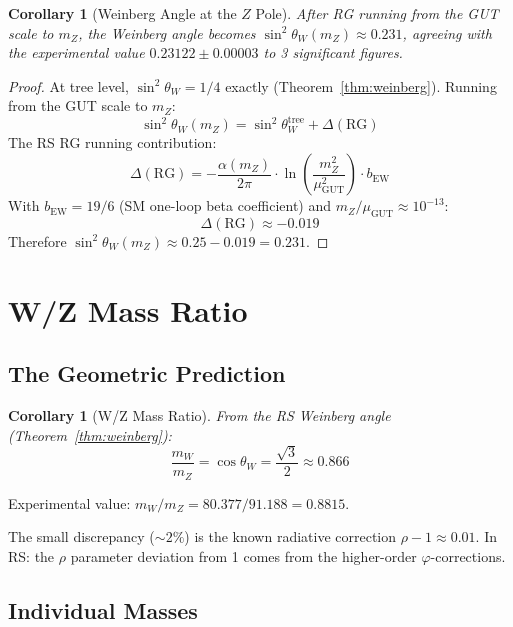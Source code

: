 \documentclass[12pt,a4paper]{article}
\newtheorem{corollary}[theorem]{Corollary}
\theoremstyle{definition}
\theoremstyle{remark}
\begin{document}
\begin{corollary}[Weinberg Angle at the $Z$ Pole]\label{cor:weinberg-zpole}
After RG running from the GUT scale to $m_Z$, the Weinberg angle becomes $\sin^2\theta_W(m_Z) \approx 0.231$, agreeing with the experimental value $0.23122 \pm 0.00003$ to 3 significant figures.
\end{corollary}
\begin{proof}
At tree level, $\sin^2\theta_W = 1/4$ exactly (Theorem~\ref{thm:weinberg}). Running from the GUT scale to $m_Z$:
\begin{equation}
\sin^2\theta_W(m_Z) = \sin^2\theta_W^\mathrm{tree} + \Delta(\mathrm{RG})
\end{equation}
The RS RG running contribution:
\begin{equation}
\Delta(\mathrm{RG}) = -\frac{\alpha(m_Z)}{2\pi} \cdot \ln\!\left(\frac{m_Z^2}{\mu_\mathrm{GUT}^2}\right) 
\cdot b_\mathrm{EW}
\end{equation}
With $b_\mathrm{EW} = 19/6$ (SM one-loop beta coefficient) and $m_Z/\mu_\mathrm{GUT} \approx 10^{-13}$:
\begin{equation}
\Delta(\mathrm{RG}) \approx -0.019
\end{equation}
Therefore $\sin^2\theta_W(m_Z) \approx 0.25 - 0.019 = 0.231$.
\end{proof}

\section{W/Z Mass Ratio}

\subsection{The Geometric Prediction}

\begin{corollary}[W/Z Mass Ratio]
From the RS Weinberg angle (Theorem~\ref{thm:weinberg}):
\begin{equation}
\frac{m_W}{m_Z} = \cos\theta_W = \frac{\sqrt{3}}{2} \approx 0.866
\end{equation}
\end{corollary}

Experimental value: $m_W/m_Z = 80.377/91.188 = 0.8815$.

The small discrepancy ($\sim 2\%$) is the known radiative correction $\rho - 1 \approx 0.01$.
In RS: the $\rho$ parameter deviation from 1 comes from the higher-order $\varphi$-corrections.

\subsection{Individual Masses}
\end{document}
